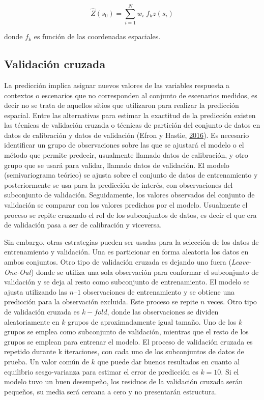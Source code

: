 \documentclass[11pt,b5paper,]{krantz}
\begin{document}
\[\hat{Z}(s_0)=\sum_{i=1}^{N}{w_i \; f_kz(s_i)}\]

donde \(f_k\) es función de las coordenadas espaciales.

\hypertarget{validaciuxf3n-cruzada}{%
\subsection{Validación cruzada}\label{validaciuxf3n-cruzada}}

La predicción implica asignar nuevos valores de las variables respuesta a contextos o escenarios que no corresponden al conjunto de escenarios medidos, es decir no se trata de aquellos sitios que utilizaron para realizar la predicción espacial. Entre las alternativas para estimar la exactitud de la predicción existen las técnicas de validación cruzada o técnicas de partición del conjunto de datos en datos de calibración y datos de validación (Efron y Hastie, \protect\hyperlink{ref-Efron_Hastie_2016}{2016}). Es necesario identificar un grupo de observaciones sobre las que se ajustará el modelo o el método que permite predecir, usualmente llamado datos de calibración, y otro grupo que se usará para validar, llamado datos de validación. El modelo (semivariograma teórico) se ajusta sobre el conjunto de datos de entrenamiento y posteriormente se usa para la predicción de interés, con observaciones del subconjunto de validación. Seguidamente, los valores observados del conjunto de validación se comparar con los valores predichos por el modelo. Usualmente el proceso se repite cruzando el rol de los subconjuntos de datos, es decir el que era de validación pasa a ser de calibración y viceversa.

Sin embargo, otras estrategias pueden ser usadas para la selección de los datos de entrenamiento y validación. Una es particionar en forma aleatoria los datos en ambos conjuntos. Otro tipo de validación cruzada es dejando uno fuera (\emph{Leave-One-Out}) donde se utiliza una sola observación para conformar el subconjunto de validación y se deja al resto como subconjunto de entrenamiento. El modelo se ajusta utilizando las \(n – 1\) observaciones de entrenamiento y se obtiene una predicción para la observación excluida. Este proceso se repite \(n\) veces. Otro tipo de validación cruzada es \(k-fold\), donde las observaciones se dividen aleatoriamente en \(k\) grupos de aproximadamente igual tamaño. Uno de los \(k\) grupos se emplea como subconjunto de validación, mientras que el resto de los grupos se emplean para entrenar el modelo. El proceso de validación cruzada es repetido durante k iteraciones, con cada uno de los subconjuntos de datos de prueba. Un valor común de \(k\) que puede dar buenos resultados en cuanto al equilibrio sesgo-varianza para estimar el error de predicción es \(k=10\). Si el modelo tuvo un buen desempeño, los residuos de la validación cruzada serán pequeños, su media será cercana a cero y no presentarán estructura.
\end{document}
